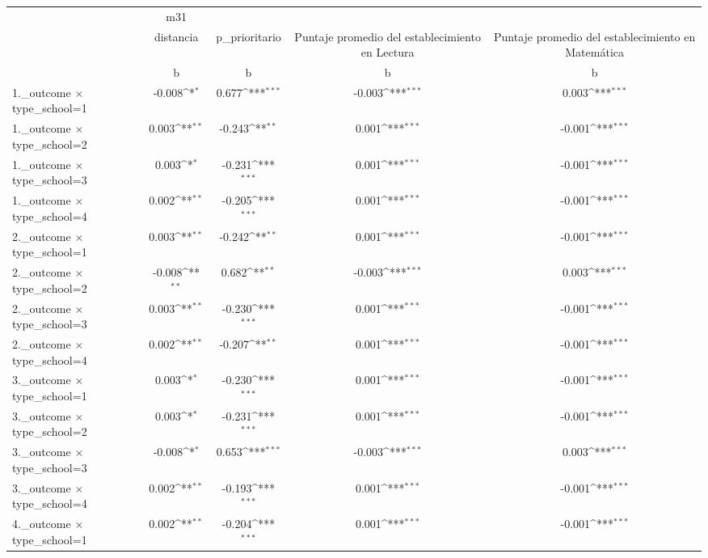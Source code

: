 {
\def\sym#1{\ifmmode^{#1}\else\(^{#1}\)\fi}
\begin{tabular}{l*{4}{c}}
\toprule
                &      m31         &                  &                  &                  \\
                &distancia         &p\_prioritario         &Puntaje promedio del establecimiento en Lectura         &Puntaje promedio del establecimiento en Matemática         \\
                &        b         &        b         &        b         &        b         \\
\midrule
1.\_outcome $\times$ type\_school=1&   -0.008\sym{*}  &    0.677\sym{***}&   -0.003\sym{***}&    0.003\sym{***}\\
1.\_outcome $\times$ type\_school=2&    0.003\sym{**} &   -0.243\sym{**} &    0.001\sym{***}&   -0.001\sym{***}\\
1.\_outcome $\times$ type\_school=3&    0.003\sym{*}  &   -0.231\sym{***}&    0.001\sym{***}&   -0.001\sym{***}\\
1.\_outcome $\times$ type\_school=4&    0.002\sym{**} &   -0.205\sym{***}&    0.001\sym{***}&   -0.001\sym{***}\\
2.\_outcome $\times$ type\_school=1&    0.003\sym{**} &   -0.242\sym{**} &    0.001\sym{***}&   -0.001\sym{***}\\
2.\_outcome $\times$ type\_school=2&   -0.008\sym{**} &    0.682\sym{**} &   -0.003\sym{***}&    0.003\sym{***}\\
2.\_outcome $\times$ type\_school=3&    0.003\sym{**} &   -0.230\sym{***}&    0.001\sym{***}&   -0.001\sym{***}\\
2.\_outcome $\times$ type\_school=4&    0.002\sym{**} &   -0.207\sym{**} &    0.001\sym{***}&   -0.001\sym{***}\\
3.\_outcome $\times$ type\_school=1&    0.003\sym{*}  &   -0.230\sym{***}&    0.001\sym{***}&   -0.001\sym{***}\\
3.\_outcome $\times$ type\_school=2&    0.003\sym{*}  &   -0.231\sym{***}&    0.001\sym{***}&   -0.001\sym{***}\\
3.\_outcome $\times$ type\_school=3&   -0.008\sym{*}  &    0.653\sym{***}&   -0.003\sym{***}&    0.003\sym{***}\\
3.\_outcome $\times$ type\_school=4&    0.002\sym{**} &   -0.193\sym{***}&    0.001\sym{***}&   -0.001\sym{***}\\
4.\_outcome $\times$ type\_school=1&    0.002\sym{**} &   -0.204\sym{***}&    0.001\sym{***}&   -0.001\sym{***}\\

\end{tabular}}

